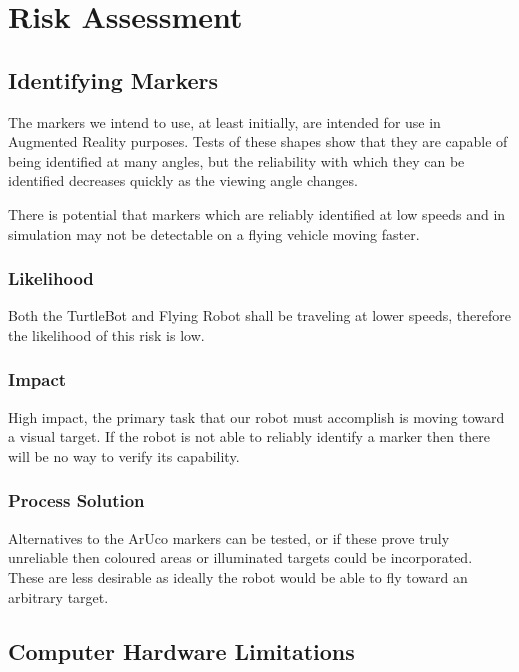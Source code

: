 \documentclass{article}
\begin{document}
\section{Risk Assessment}

	\subsection{Identifying Markers}
	
	The markers we intend to use, at least initially, are intended for use in Augmented Reality purposes. Tests of these shapes show that they are capable of being identified at many angles, but the reliability with which they can be identified decreases quickly as the viewing angle changes. 
	
	There is potential that markers which are reliably identified at low speeds and in simulation may not be detectable on a flying vehicle moving faster.
	
		\subsubsection{Likelihood}
 
		Both the TurtleBot and Flying Robot shall be traveling at lower speeds, therefore the likelihood of this risk is low.
		
		\subsubsection{Impact}
		
		High impact, the primary task that our robot must accomplish is moving toward a visual target. If the robot is not able to reliably identify a marker then there will be no way to verify its capability.
		
		\subsubsection{Process Solution}
		
		Alternatives to the ArUco markers can be tested, or if these prove truly unreliable then coloured areas or illuminated targets could be incorporated. These are less desirable as ideally the robot would be able to fly toward an arbitrary target.
		
	\subsection{Computer Hardware Limitations}
	
\end{document}
